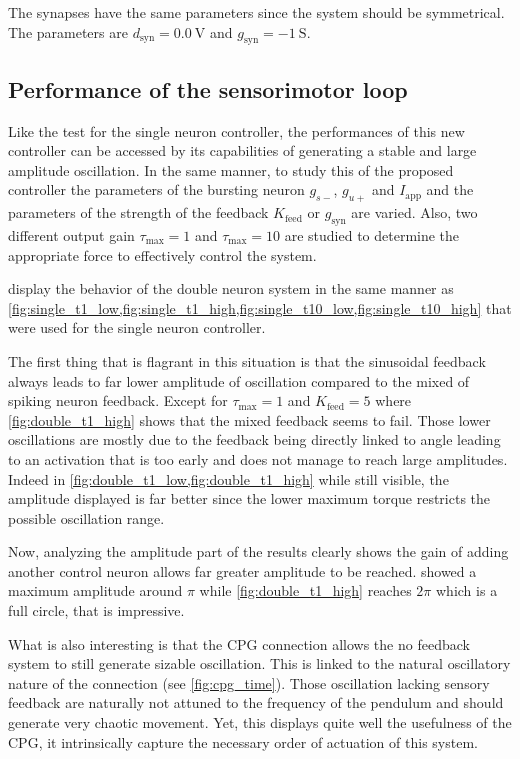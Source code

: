 The synapses have the same parameters since the system should be symmetrical. The parameters are $d_\text{syn} = \qty{0.0}{\volt}$ and $g_\text{syn} = \qty{-1}{\siemens}$.

\subsection{Performance of the sensorimotor loop}

Like the test for the single neuron controller, the performances of this new controller can be accessed by its capabilities of generating a stable and large amplitude oscillation. In the same manner, to study this of the proposed controller the parameters of the bursting neuron $g_{s-}$, $g_{u+}$ and $I_\text{app}$ and the parameters of the strength of the feedback $K_\text{feed}$ or $g_\text{syn}$ are varied. Also, two different output gain $\tau_\text{max} = 1$ and $\tau_\text{max} = 10$ are studied to determine the appropriate force to effectively control the system.  %

 display the behavior of the double neuron system in the same manner as \cref{fig:single_t1_low,fig:single_t1_high,fig:single_t10_low,fig:single_t10_high} that were used for the single neuron controller.

The first thing that is flagrant in this situation is that the sinusoidal feedback always leads to far lower amplitude of oscillation compared to the mixed of spiking neuron feedback. Except for $\tau_\text{max}=1$ and $K_\text{feed} = 5$ where \cref{fig:double_t1_high} shows that the mixed feedback seems to fail. Those lower oscillations are  mostly due to the feedback being directly linked to angle leading to an activation that is too early and does not manage to reach large amplitudes. Indeed in \cref{fig:double_t1_low,fig:double_t1_high} while still visible, the amplitude displayed is far better since the lower maximum torque restricts the possible oscillation range.

Now, analyzing the amplitude part of the results clearly shows the gain of adding another control neuron allows far greater amplitude to be reached.  showed a maximum amplitude around $\pi$ while \cref{fig:double_t1_high} reaches $2\pi$ which is a full circle, that is impressive. 

What is also interesting is that the CPG connection  allows the no feedback system to still generate sizable oscillation. This is linked to the natural oscillatory nature of the connection (see \cref{fig:cpg_time}). Those oscillation lacking sensory feedback are naturally not attuned to the frequency of the pendulum and should generate very chaotic movement. Yet, this displays quite well the usefulness of the CPG, it intrinsically capture the necessary order of actuation of this system.
 
